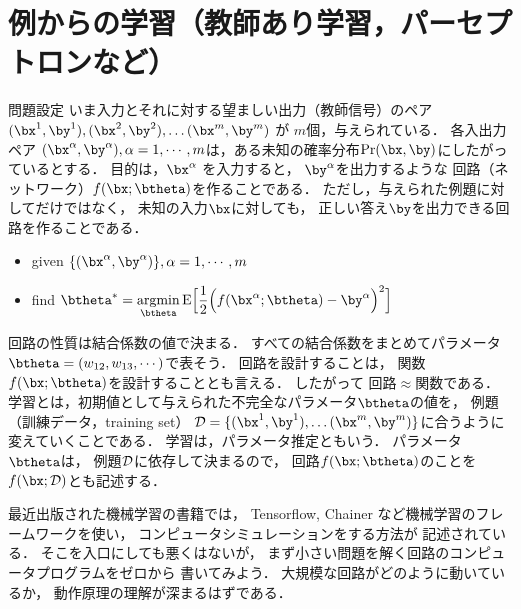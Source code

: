 \documentclass[a4paper,11pt]{jarticle}
\begin{document}
\section{例からの学習（教師あり学習，パーセプトロンなど）\cite{rumelhart86b,amari88c,sgeman92a}}
%      
\begin{itembox}[l]{問題設定}
      いま入力とそれに対する望ましい出力（教師信号）のペア
      $
      (\bx^1, \by^1),
      (\bx^2, \by^2), \dots
      (\bx^m, \by^m)$ が $m$個，与えられている．
各入出力ペア $(\bx^\alpha, \by^\alpha), \alpha=1,\cdots,m$は，ある未知の確率分布$\Pr(\bx,\by)$にしたがっているとする．
      目的は，$\bx^\alpha$ を入力すると，
      $\by^\alpha$を出力するような
      回路（ネットワーク）$f(\bx;\btheta)$を作ることである．
      ただし，与えられた例題に対してだけではなく，
      未知の入力$\bx$に対しても，
      正しい答え$\by$を出力できる回路を作ることである．


\begin{itemize}
\item given $ \{ (\bx^\alpha, \by^\alpha) \}, \alpha=1,\cdots,m $
 \item find
       $ \btheta^* = {\displaystyle \mathop{\rm argmin}_{\btheta}
       {\rm E} \Bigl [   \frac{1}{2} \Bigl ( f(\bx^\alpha;\btheta) -
       \by^\alpha \Bigr )^2  \Bigr ] }  $
\end{itemize}
\end{itembox}

回路の性質は結合係数の値で決まる．
すべての結合係数をまとめてパラメータ$\btheta=(w_{12},w_{13},\cdots)$で表そう．
回路を設計することは，
関数$f(\bx;\btheta)$を設計することとも言える．
したがって
回路$\approx$関数である．
学習とは，初期値として与えられた不完全なパラメータ$\btheta$の値を，
例題（訓練データ，training set）
${\cal D} = \{
      (\bx^1, \by^1), \dots
      (\bx^m, \by^m)
      \}
      $に合うように変えていくことである．
学習は，パラメータ推定ともいう．
パラメータ$\btheta$は，
例題${\cal D}$に依存して決まるので，
回路$f(\bx;\btheta)$のことを $f(\bx;{\cal D})$とも記述する．


最近出版された機械学習の書籍では，
Tensorflow, Chainer など機械学習のフレームワークを使い，
コンピュータシミュレーションをする方法が
記述されている．
そこを入口にしても悪くはないが，
まず小さい問題を解く回路のコンピュータプログラムをゼロから
書いてみよう．
大規模な回路がどのように動いているか，
動作原理の理解が深まるはずである．

\rhead{}
\end{document}
